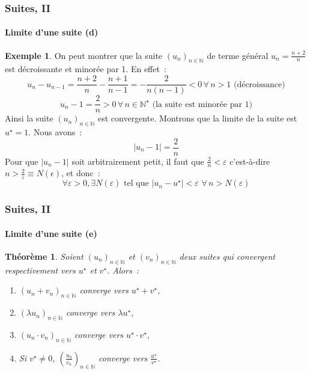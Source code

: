 \documentclass[10pt,notheorems]{beamer}
\theoremstyle{plain}
\newtheorem{theorem}{Théorème}
\theoremstyle{definition} %
\newtheorem{example}{Exemple}
\begin{document}
\begin{frame}
  \frametitle{Suites, II}
  \framesubtitle{Limite d'une suite (d)}
  \hypertarget{slide_suite_limite_4}{}

  \bigskip

  \begin{example}

    On peut montrer que la suite $(u_n)_{n\in\mathbb N}$ de terme général $u_n = \frac{n+2}{n}$ est décroissante et minorée par 1. En effet~:
    \[
      u_n-u_{n-1} = \frac{n+2}{n}-\frac{n+1}{n-1} = -\frac{2}{n(n-1)}<0\, \forall\, n>1 \text{ (décroissance)}
    \]
    \[
      u_n-1 = \frac{2}{n} > 0\, \forall\, n\in\mathbb N^{\star} \text{ (la suite est minorée par 1)}
    \]
    Ainsi la suite $(u_n)_{n\in\mathbb N}$ est convergente. Montrons que la limite de la suite est $u^{\star}=1$. Nous avons~:
    \[
      |u_n-1| = \frac{2}{n}
    \]
    Pour que $|u_n-1|$ soit arbitrairement petit, il faut que $\frac{2}{n}<\varepsilon$ c'est-à-dire $n>\frac{2}{\varepsilon}\equiv N(\epsilon)$, et donc~:
    \[
      \forall \varepsilon>0, \exists N(\varepsilon) \text{ tel que } |u_n-u^{\star}|<\varepsilon\,\, \forall \, n>N(\varepsilon)
    \]
  \end{example}

\end{frame}


\begin{frame}
  \frametitle{Suites, II}
  \framesubtitle{Limite d'une suite (e)}
  \hypertarget{slide_suite_limite_5}{}

  \bigskip

  \begin{theorem}
    Soient $(u_n)_{n\in\mathbb N}$ et $(v_n)_{n\in\mathbb N}$ deux suites qui convergent respectivement vers $u^{\star}$ et $v^{\star}$. Alors~:\newline

    \begin{enumerate}

    \item $(u_n+v_n)_{n\in\mathbb N}$ converge vers $u^{\star}+v^{\star}$,\newline

    \item $(\lambda u_n)_{n\in\mathbb N}$ converge vers $\lambda u^{\star}$,\newline

    \item $(u_n\cdot v_n)_{n\in\mathbb N}$ converge vers $u^{\star}\cdot v^{\star}$,\newline

    \item Si $v^{\star}\neq 0$, $\left(\frac{u_n}{v_n}\right)_{n\in\mathbb N}$ converge vers $\frac{u^{\star}}{v^{\star}}$.\newline
    \end{enumerate}
  \end{theorem}

\end{frame}
\end{document}
